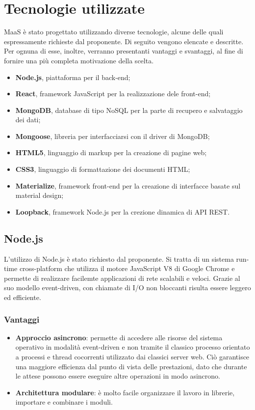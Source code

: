 \section{Tecnologie utilizzate}
MaaS \`e stato progettato utilizzando diverse tecnologie, alcune delle quali espressamente richieste dal proponente. Di seguito vengono elencate e descritte. Per ognuna di esse, inoltre, verranno presentanti vantaggi e svantaggi, al fine di fornire una pi\`u completa motivazione della scelta.
\begin{itemize}
\item \textbf{Node.js}, piattaforma per il back-end;
\item \textbf{React}, framework JavaScript per la realizzazione dele front-end;
\item \textbf{MongoDB}, database di tipo NoSQL per la parte di recupero e salvataggio dei dati;
\item \textbf{Mongoose}, libreria per interfacciarsi con il driver di MongoDB;
\item \textbf{HTML5}, linguaggio di markup per la creazione di pagine web;
\item \textbf{CSS3}, linguaggio di formattazione dei documenti HTML;
\item \textbf{Materialize}, framework front-end per la creazione di interfacce basate sul material design;
\item \textbf{Loopback}, framework Node.js per la crezione dinamica di API REST.
\end{itemize}
\subsection{Node.js}
L'utilizzo di Node.js \`e stato richiesto dal proponente. Si tratta di un sistema run-time cross-platform che utilizza il motore JavaScript V8 di Google Chrome e permette di realizzare facilemte applicazioni di rete scalabili e veloci. Grazie al suo modello event-driven, con chiamate di I/O non bloccanti risulta essere leggero ed efficiente.
\subsubsection{Vantaggi}
\begin{itemize}
\item \textbf{Approccio asincrono}: permette di accedere alle risorse del sistema operativo in modalit\`a event-driven e non tramite il classico processo orientato a processi e thread cocorrenti utilizzato dai classici server web. Ci\`o garantisce una maggiore efficienza dal punto di vista delle prestazioni, dato che durante le attese possono essere eseguire altre operazioni in modo asincrono.
\item \textbf{Architettura modulare}: \`e molto facile organizzare il lavoro in librerie, importare e combinare i moduli.
\end{itemize}
